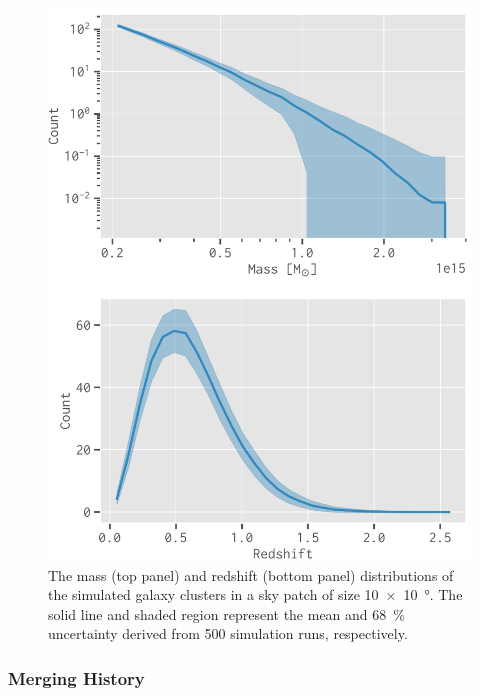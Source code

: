 \documentclass[twocolumn]{aastex62}
\newcommand{\editone}[1]{{\leavevmode\color{cyan}#1}}
\begin{document}
\begin{figure}
  \centering
  \includegraphics[width=\columnwidth]{mass-z-dist}
  \caption{\label{fig:m-z-dist}\editone{%
    The mass (top panel) and redshift (bottom panel) distributions of the
    simulated galaxy clusters in a sky patch of size
    \SI[product-units=repeat]{10 x 10}{\degree}.
    The solid line and shaded region represent the mean and
    \SI{68}{\percent} uncertainty derived from 500 simulation runs,
    respectively.
  }}
\end{figure}

\subsubsection{Merging History}
\label{sec:merging-history}
\end{document}
